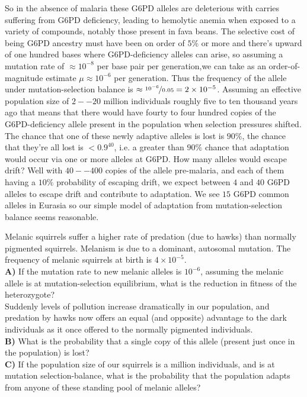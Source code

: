 So in the absence of malaria these G6PD alleles are deleterious with
carries suffering from G6PD deficiency,
leading to hemolytic anemia when exposed to a variety of compounds, notably those present in fava beans.
The selective cost of being G6PD ancestry must have been on order of
$5\%$ or more and there's upward of one hundred bases where G6PD-deficiency alleles can arise, so assuming a mutation rate of $\approx 10^{-8}$ per base pair per
generation,we can take as an order-of-magnitude estimate $\mu \approx
10^{-6}$ per generation. Thus the frequency of the allele under
mutation-selection balance is $\approx \nicefrac{10^{-6}}{0.05} =2
\times 10^{-5}$. Assuming an effective population size of $2--20$ million
individuals roughly five to ten thousand years ago that means that
there would have fourty to four hundred copies of the G6PD-deficiency
allele present in the population when selection pressures shifted. The
chance that one of these newly adaptive alleles is lost
is $90\%$, the chance that they're all lost is $<0.9^{40}$, i.e. a
greater than $90\%$ chance that adaptation would occur via one or more
alleles at G6PD. How many alleles would escape drift? Well with $40--400$
copies of the allele pre-malaria, and each of them having a $10\%$
probability of escaping drift, we expect between $4$ and $40$ G6PD
alleles to escape drift and contribute to adaptation. We see $15$ G6PD
common alleles in Eurasia so our simple model of adaptation from
mutation-selection balance seems reasonable.   


\begin{question}
Melanic squirrels suffer a higher rate of predation (due to hawks) than normally pigmented squirrels. Melanism is due to a dominant, autosomal mutation. The frequency of melanic squirrels at birth is $4 \times 10^{-5}$.\\

{\bf A)} If the mutation rate to new melanic alleles is $10^{-6}$,
assuming the melanic allele is at mutation-selection equilibrium, what
is the reduction in fitness of the heterozygote? \\ 
Suddenly levels of pollution increase dramatically in our population,
and predation by hawks now offers an equal (and opposite) advantage to
the dark individuals as it once offered to the normally pigmented
individuals. \\
{\bf B)} What is the probability that a single copy of this allele
(present just once in the population) is lost?\\ 
{\bf C)}  If the population size of our squirrels is a million
individuals, and is at mutation selection-balance, what is the probability that the population adapts from
anyone of these standing pool of melanic alleles?  
\end{question}

